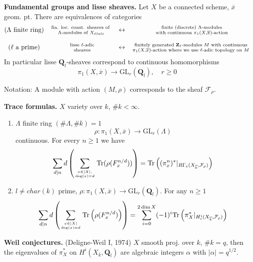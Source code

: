 \documentclass{stacks-project}
\theoremstyle{plain}
\theoremstyle{definition}
\theoremstyle{remark}
\numberwithin{equation}{subsection}
\def\etale{{\acute{e}tale}}
\begin{document}
\medskip\noindent
{\bf Fundamental groups and lisse sheaves.}
Let $X$ be a connected scheme, $\overline{x}$ geom. pt. There are
equivalences of categories
$$
\begin{matrix}
(\Lambda\text{ finite ring}) &
\text{fin. loc. const. sheaves of }
\atop \Lambda\text{-modules of }X_\etale & \leftrightarrow &
\text{ finite (discrete) }\Lambda\text{-modules}
\atop \text{ with continuous }\pi_1(X, \overline{x})\text{-action}\\
\\
(\ell\text{ a prime}) & \text{ lisse }\ell\text{-adic} \atop \text{ sheaves} &
\leftrightarrow &
\text{finitely generated }\mathbf{Z}_\ell
\text{-modules }M\text{ with continuous}
\atop \pi_1(X, \overline{x})\text{-action where we use }
\ell\text{-adic topology on }M
\end{matrix}
$$
In particular lisse $\mathbf{Q}_l$-sheaves correspond to continuous
homomorphisms
$$
\pi_1(X, \overline{x}) \to \text{GL}_r(\mathbf{Q}_l), \quad r\geq 0
$$

\noindent
Notation: A module with action $(M, \rho)$ corresponds to the sheaf
$\mathcal{F}_\rho$.

\medskip\noindent
{\bf Trace formulas.} $X$ variety over $k$, $\# k < \infty$.
\begin{enumerate}
\item $\Lambda$ finite ring $(\# \Lambda, \# k)=1$
$$
\rho : \pi_1(X, \overline{x})\to \text{GL}_r(\Lambda)
$$
continuous. For every $n\geq 1$ we have
$$
\sum_{d|n}d\left(
\sum_{x\in |X|, \atop \deg(x)=d}
\text{Tr}(\rho(F_x^{n/d}))\right) =
\text{Tr}\left(
(\pi_x^n)^* |_{R\Gamma_c(X_{\overline{k}}, \mathcal{F}_\rho)}\right)
$$
\item $l\neq char(k)$ prime, $\rho : \pi_1(X, \overline{x})\to
\text{GL}_r(\mathbf{Q}_l)$. For any $n\geq 1$
$$
\sum_{d|n} d\left(
\sum_{x\in |X| \atop \deg(x)=d}
\text{Tr}
\left(
\rho(F_x^{n/d})
\right)
\right) =
\sum_{i = 0}^{2\dim X}
(-1)^i
\text{Tr}\left(
\pi_X^* |_{H_c^i(X_{\overline{k}}, \mathcal{F}_\rho)}\right)
$$
\end{enumerate}

\noindent
{\bf Weil conjectures.} (Deligne-Weil I, 1974) $X$ smooth proj. over $k$,
$\# k = q$, then the eigenvalues of $\pi_X^*$ on $H^i(X_{\overline{k}},
\mathbf{Q}_l)$ are algebraic integers $\alpha$ with $|\alpha|=q^{1/2}$.
\end{document}
